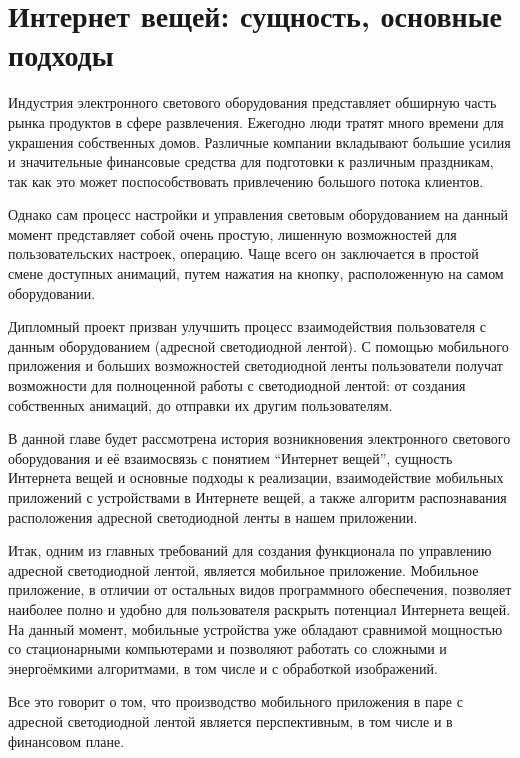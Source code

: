 \section{Интернет вещей: сущность, основные подходы}
\label{sec:subject}

Индустрия электронного светового оборудования представляет обширную часть рынка продуктов в сфере развлечения. Ежегодно люди тратят много времени для украшения собственных домов. Различные компании вкладывают большие усилия и значительные финансовые средства для подготовки к различным праздникам, так как это может поспособствовать привлечению большого потока клиентов.

Однако сам процесс настройки и управления световым оборудованием на данный момент представляет собой очень простую, лишенную возможностей для пользовательских настроек, операцию. Чаще всего он заключается в простой смене доступных анимаций, путем нажатия на кнопку, расположенную на самом оборудовании.

Дипломный проект призван улучшить процесс взаимодействия пользователя с данным оборудованием (адресной светодиодной лентой). С помощью мобильного приложения и больших возможностей светодиодной ленты пользователи получат возможности для полноценной работы с светодиодной лентой: от создания собственных анимаций, до отправки их другим пользователям.

В данной главе будет рассмотрена история возникновения электронного светового оборудования и её взаимосвязь с понятием \enquote{Интернет вещей}, сущность Интернета вещей и основные подходы к реализации, взаимодействие мобильных приложений с устройствами в Интернете вещей, а также алгоритм распознавания расположения адресной светодиодной ленты в нашем приложении.











Итак, одним из главных требований для создания функционала по управлению адресной светодиодной лентой, является мобильное приложение. Мобильное приложение, в отличии от остальных видов программного обеспечения, позволяет наиболее полно и удобно для пользователя раскрыть потенциал Интернета вещей. На данный момент, мобильные устройства уже обладают сравнимой мощностью со стационарными компьютерами и позволяют работать со сложными и энергоёмкими алгоритмами, в том числе и с обработкой изображений.

Все это говорит о том, что производство мобильного приложения в паре с адресной светодиодной лентой является перспективным, в том числе и в финансовом плане.